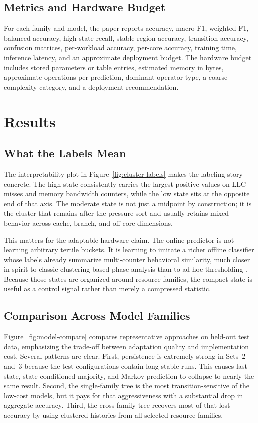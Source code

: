 \documentclass[10pt,twocolumn]{article}
\begin{document}
\subsection{Metrics and Hardware Budget}

For each family and model, the paper reports accuracy, macro F1, weighted F1, balanced accuracy, high-state recall, stable-region accuracy, transition accuracy, confusion matrices, per-workload accuracy, per-core accuracy, training time, inference latency, and an approximate deployment budget.
The hardware budget includes stored parameters or table entries, estimated memory in bytes, approximate operations per prediction, dominant operator type, a coarse complexity category, and a deployment recommendation.

\section{Results}

\subsection{What the Labels Mean}

The interpretability plot in Figure~\ref{fig:cluster-labels} makes the labeling story concrete.
The high state consistently carries the largest positive values on LLC misses and memory bandwidth counters, while the low state sits at the opposite end of that axis.
The moderate state is not just a midpoint by construction; it is the cluster that remains after the pressure sort and usually retains mixed behavior across cache, branch, and off-core dimensions.

This matters for the adaptable-hardware claim.
The online predictor is not learning arbitrary tertile buckets.
It is learning to imitate a richer offline classifier whose labels already summarize multi-counter behavioral similarity, much closer in spirit to classic clustering-based phase analysis than to ad hoc thresholding \cite{sherwood2002simpoint,hamerly2005simpoint3,jain1999data}.
Because those states are organized around resource families, the compact state is useful as a control signal rather than merely a compressed statistic.

\subsection{Comparison Across Model Families}

Figure~\ref{fig:model-compare} compares representative approaches on held-out test data, emphasizing the trade-off between adaptation quality and implementation cost.
Several patterns are clear.
First, persistence is extremely strong in Sets~2 and~3 because the test configurations contain long stable runs.
This causes last-state, state-conditioned majority, and Markov prediction to collapse to nearly the same result.
Second, the single-family tree is the most transition-sensitive of the low-cost models, but it pays for that aggressiveness with a substantial drop in aggregate accuracy.
Third, the cross-family tree recovers most of that lost accuracy by using clustered histories from all selected resource families.
\end{document}
